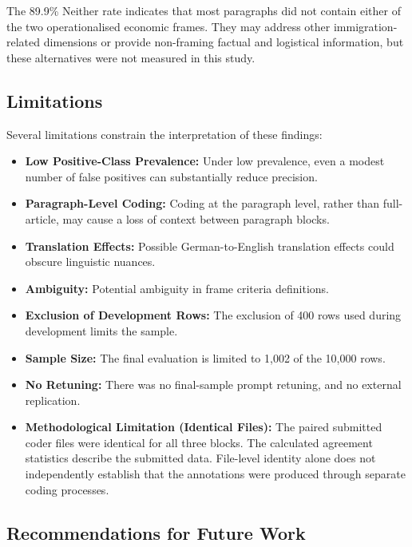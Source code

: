 The 89.9\% Neither rate indicates that most paragraphs did not contain either of the two operationalised economic frames. They may address other immigration-related dimensions or provide non-framing factual and logistical information, but these alternatives were not measured in this study.


\subsection{Limitations}
Several limitations constrain the interpretation of these findings:
\begin{itemize}
    \item \textbf{Low Positive-Class Prevalence:} Under low prevalence, even a modest number of false positives can substantially reduce precision.
    \item \textbf{Paragraph-Level Coding:} Coding at the paragraph level, rather than full-article, may cause a loss of context between paragraph blocks.
    \item \textbf{Translation Effects:} Possible German-to-English translation effects could obscure linguistic nuances.
    \item \textbf{Ambiguity:} Potential ambiguity in frame criteria definitions.
    \item \textbf{Exclusion of Development Rows:} The exclusion of 400 rows used during development limits the sample.
    \item \textbf{Sample Size:} The final evaluation is limited to 1,002 of the 10,000 rows.
    \item \textbf{No Retuning:} There was no final-sample prompt retuning, and no external replication.
    \item \textbf{Methodological Limitation (Identical Files):} The paired submitted coder files were identical for all three blocks. The calculated agreement statistics describe the submitted data. File-level identity alone does not independently establish that the annotations were produced through separate coding processes.
\end{itemize}
\subsection{Recommendations for Future Work}

